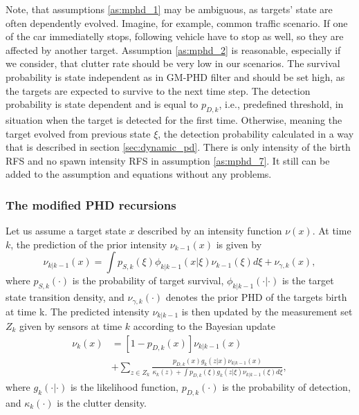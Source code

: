 Note, that assumptions \ref{as:mphd_1} may be ambiguous, as targets' state are often dependently evolved. Imagine,
for example, common traffic scenario. If one of the car immediatelly stops, following vehicle have to stop as well,
so they are affected by another target.
Assumption \ref{as:mphd_2} is reasonable, especially if we consider, that clutter rate should be very low in our 
scenarios.
The survival probability is state independent as in GM-PHD filter and should be set high, as the targets are expected
to survive to the next time step.
The detection probability is state dependent and is equal to $p_{D,k}$, i.e., predefined threshold, in situation when
the target is detected for the first time. Otherwise, meaning the target evolved from previous state $\xi$, the
detection probability calculated in a way that is described in section \ref{sec:dynamic_pd}. There is only intensity
of the birth RFS and no spawn intensity RFS in assumption \ref{as:mphd_7}. It still can be added to the assumption
and equations without any problems.

\subsubsection{The modified PHD recursions}
Let us assume a target state $x$ described by an intensity function $\nu(x)$. At time $k$, the prediction of the prior
intensity $\nu_{k-1}(x)$ is given by
\begin{equation}
  \nu_{k|k-1}(x) = \int p_{S,k}(\xi)\phi_{k|k-1}(x|\xi)\nu_{k-1}(\xi)d\xi + \nu_{\gamma,k}(x), \label{eq:mphdPrior}
\end{equation}
where $p_{S,k}(\cdot)$ is the probability of target survival, $\phi_{k|k-1}(\cdot|\cdot)$ is the target state transition density, and $\nu_{\gamma,k}(\cdot)$ denotes the prior PHD of the targets birth at time k.
The predicted intensity $\nu_{k|k-1}$ is then updated by the measurement set $Z_k$ given by sensors at time $k$ according to the Bayesian update
\begin{equation}
  \begin{aligned}
    \nu_k(x) &= [1 - p_{D,k}(x)]\nu_{k|k-1}(x) \\
    &+ \sum_{z \in Z_k}\frac{p_{D,k}(x) g_k(z|x) \nu_{k|k-1}(x)}{\kappa_k(z) + \int p_{D,k}(\xi) g_k(z|\xi) \nu_{k|
    k-1}(\xi)d\xi}, \label{eq:mphdPosterior}
  \end{aligned}
\end{equation}
where $g_k(\cdot|\cdot)$ is the likelihood function, $p_{D,k}(\cdot)$ is the probability of detection, and $\kappa_k(\cdot)$ is the clutter density.

